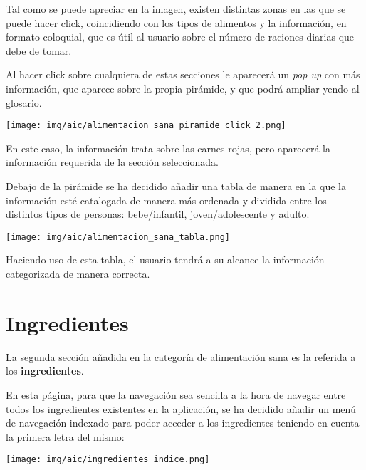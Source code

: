 \documentclass{\ClassPath/viu-tfm-template}
\begin{document}
Tal como se puede apreciar en la imagen, existen distintas zonas en las que se puede hacer click, coincidiendo con los tipos de alimentos y la información, en formato coloquial, que es útil al usuario sobre el número de raciones diarias que debe de tomar.

Al hacer click sobre cualquiera de estas secciones le aparecerá un \textit{pop up} con más información, que aparece sobre la propia pirámide, y que podrá ampliar yendo al glosario.

\begin{center}
    \vspace{-10pt}
    \texttt{[image: img/aic/alimentacion\_sana\_piramide\_click\_2.png]}
    \vspace{-20pt}
\end{center}

En este caso, la información trata sobre las carnes rojas, pero aparecerá la información requerida de la sección seleccionada.

Debajo de la pirámide se ha decidido añadir una tabla de manera en la que la información esté catalogada de manera más ordenada y dividida entre los distintos tipos de personas: bebe/infantil, joven/adolescente y adulto.

\begin{center}
    \vspace{-10pt}
    \texttt{[image: img/aic/alimentacion\_sana\_tabla.png]}
    \vspace{-20pt}
\end{center}

Haciendo uso de esta tabla, el usuario tendrá a su alcance la información categorizada de manera correcta.


\section{Ingredientes}
La segunda sección añadida en la categoría de alimentación sana es la referida a los \textbf{ingredientes}.

En esta página, para que la navegación sea sencilla a la hora de navegar entre todos los ingredientes existentes en la aplicación, se ha decidido añadir un menú de navegación indexado para poder acceder a los ingredientes teniendo en cuenta la primera letra del mismo:


\begin{center}
    \vspace{-10pt}
    \texttt{[image: img/aic/ingredientes\_indice.png]}
    \vspace{-20pt}
\end{center}
\end{document}
